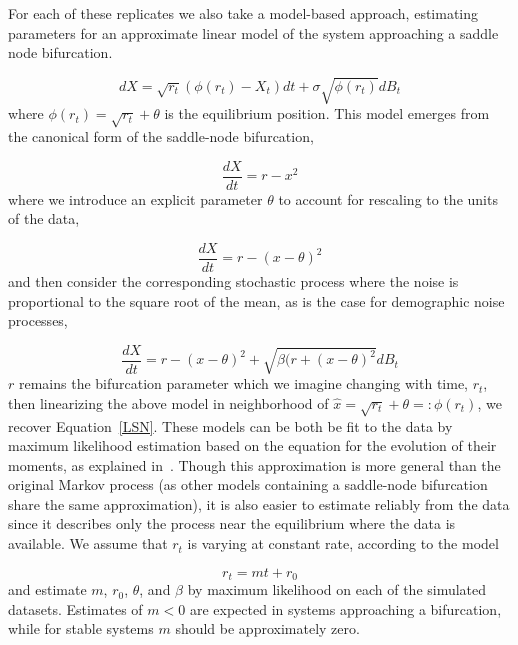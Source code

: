 \documentclass[authoryear,review,12pt]{elsarticle}
\begin{document}
For each of these replicates we also take a model-based approach, estimating 
parameters for an approximate linear model of the system approaching a
saddle node bifurcation.


\begin{equation}
  dX = \sqrt{ r_t } (\phi(r_t) - X_t) dt +
  \sigma\sqrt{\phi(r_t) } d B_t \label{LSN}
\end{equation}
where \( \phi(r_t) = \sqrt{r_t} +\theta \) is the equilibrium position.  
This model emerges from the canonical form of the saddle-node bifurcation,

\begin{equation}
  \frac{dX}{dt} = r - x^2
\end{equation}
where we introduce an explicit parameter $\theta$ to account for rescaling
to the units of the data,

\begin{equation}
   \frac{dX}{dt} = r - (x-\theta)^2
\end{equation}
and then consider the corresponding stochastic process where the noise is
proportional to the square root of the mean, as is the case for demographic
noise processes,

\begin{equation}
  \frac{dX}{dt} = r - (x-\theta)^2 + \sqrt{ \beta (r + (x-\theta)^2 } dB_t
\end{equation}
$r$ remains the bifurcation parameter which we imagine changing with time,
$r_t$, then linearizing the above model in neighborhood of
\(\hat x = \sqrt{r_t} +\theta =: \phi(r_t)\), we recover Equation~\eqref{LSN}.
These models can be both be fit to the data by maximum likelihood estimation
based on the equation for the evolution of their moments, as explained
in~\citet{Boettiger2012b}.  Though this approximation is more general than 
the original Markov process (as other models containing a saddle-node bifurcation
share the same approximation), it is also easier to estimate reliably from 
the data since it describes only the process near the equilibrium where the
data is available.  We assume that $r_t$ is varying at constant rate, 
according to the model

\begin{equation}
 r_t = m t + r_0 
\end{equation}
and estimate $m$, $r_0$, $\theta$, and $\beta$ by maximum likelihood on each
of the simulated datasets.  Estimates of $m < 0 $ are expected in systems 
approaching a bifurcation, while for stable systems $m$ should be approximately zero.
\end{document}

